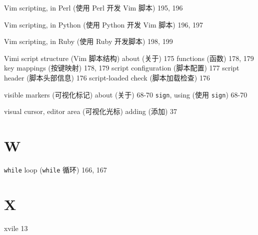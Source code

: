 Vim scripting, in Perl (使用 Perl 开发 Vim 脚本) 195, 196

Vim scripting, in Python (使用 Python 开发 Vim 脚本) 196, 197

Vim scripting, in Ruby (使用 Ruby 开发脚本) 198, 199

Vimi script structure (Vim 脚本结构)
  about (关于) 175
  functions (函数) 178, 179
  key mappings (按键映射) 178, 179
  script configuration (脚本配置) 177
  script header (脚本头部信息) 176
  script-loaded check (脚本加载检查) 176

visible markers (可视化标记)
  about (关于) 68-70
  \texttt{sign}, using (使用 \texttt{sign}) 68-70

visual cursor, editor area (可视化光标)
  adding (添加) 37

\section{W}

\texttt{while} loop (\texttt{while} 循环) 166, 167

\section{X}

xvile 13
